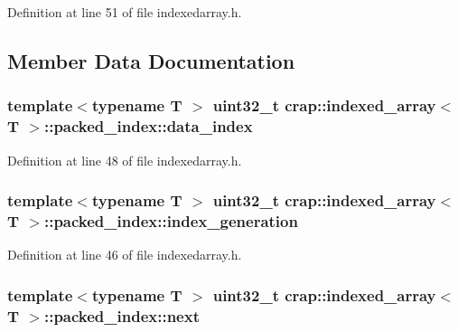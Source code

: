 Definition at line 51 of file indexedarray.\+h.



\subsection{Member Data Documentation}
\hypertarget{structcrap_1_1indexed__array_1_1packed__index_a743ddc52af6d873167476bbca9fc23a8}{
\subsubsection[{data\+\_\+index}]{\setlength{\rightskip}{0pt plus 5cm}template$<$typename T $>$ uint32\+\_\+t {\bf crap\+::indexed\+\_\+array}$<$ T $>$\+::packed\+\_\+index\+::data\+\_\+index}}\label{structcrap_1_1indexed__array_1_1packed__index_a743ddc52af6d873167476bbca9fc23a8}


Definition at line 48 of file indexedarray.\+h.

\hypertarget{structcrap_1_1indexed__array_1_1packed__index_af5423207ebc6a3cbf46e5689d840e2af}{
\subsubsection[{index\+\_\+generation}]{\setlength{\rightskip}{0pt plus 5cm}template$<$typename T $>$ uint32\+\_\+t {\bf crap\+::indexed\+\_\+array}$<$ T $>$\+::packed\+\_\+index\+::index\+\_\+generation}}\label{structcrap_1_1indexed__array_1_1packed__index_af5423207ebc6a3cbf46e5689d840e2af}


Definition at line 46 of file indexedarray.\+h.

\hypertarget{structcrap_1_1indexed__array_1_1packed__index_a790171618ecc2fe9aa6b1b7526c43201}{
\subsubsection[{next}]{\setlength{\rightskip}{0pt plus 5cm}template$<$typename T $>$ uint32\+\_\+t {\bf crap\+::indexed\+\_\+array}$<$ T $>$\+::packed\+\_\+index\+::next}}\label{structcrap_1_1indexed__array_1_1packed__index_a790171618ecc2fe9aa6b1b7526c43201}



